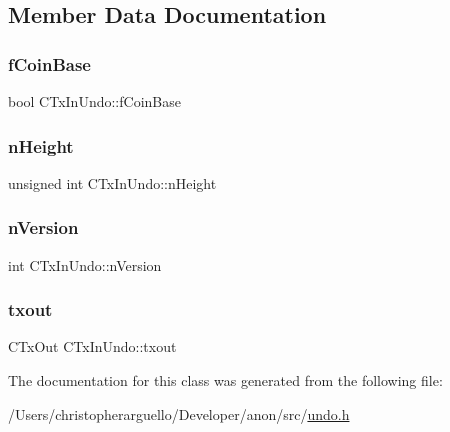 \subsection{Member Data Documentation}
\mbox{\label{class_c_tx_in_undo_a5952f917224de3a2193157b856c47864}} 
\subsubsection{\texorpdfstring{f\+Coin\+Base}{fCoinBase}}
{\footnotesize\ttfamily bool C\+Tx\+In\+Undo\+::f\+Coin\+Base}

\mbox{\label{class_c_tx_in_undo_af022118f015a9b1b9ab96e04e8452292}} 
\subsubsection{\texorpdfstring{n\+Height}{nHeight}}
{\footnotesize\ttfamily unsigned int C\+Tx\+In\+Undo\+::n\+Height}

\mbox{\label{class_c_tx_in_undo_a193281289475ca792e436a7a02de23ef}} 
\subsubsection{\texorpdfstring{n\+Version}{nVersion}}
{\footnotesize\ttfamily int C\+Tx\+In\+Undo\+::n\+Version}

\mbox{\label{class_c_tx_in_undo_a0eb1374984b5b68b0af14d88d7d4b821}} 
\subsubsection{\texorpdfstring{txout}{txout}}
{\footnotesize\ttfamily C\+Tx\+Out C\+Tx\+In\+Undo\+::txout}



The documentation for this class was generated from the following file\+:\begin{DoxyCompactItemize}
\item 
/\+Users/christopherarguello/\+Developer/anon/src/\mbox{\hyperlink{undo_8h}{undo.\+h}}\end{DoxyCompactItemize}

